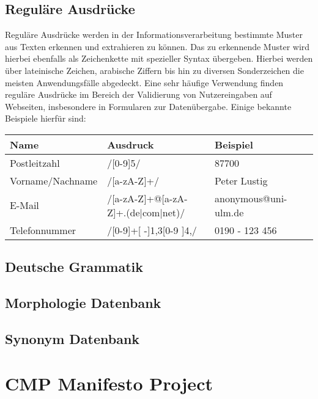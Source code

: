 \subsection{Reguläre Ausdrücke	}
Reguläre Ausdrücke werden in der Informationsverarbeitung bestimmte Muster aus Texten erkennen und extrahieren zu können. Das zu erkennende Muster wird hierbei ebenfalls als Zeichenkette mit spezieller Syntax übergeben. Hierbei werden über lateinische Zeichen, arabische Ziffern bis hin zu diversen Sonderzeichen die meisten Anwendungsfälle abgedeckt.
Eine sehr häufige Verwendung finden reguläre Ausdrücke im Bereich der Validierung von Nutzereingaben auf Webseiten, insbesondere in Formularen zur Datenübergabe. Einige bekannte Beispiele hierfür sind:
\newline
\begin{tabular}{llll}
\hline
Name & Ausdruck & Beispiel \\
\hline
Postleitzahl & /[0-9]{5}/ & 87700 \\
Vorname/Nachname & /[a-zA-Z]+/ & Peter Lustig \\
E-Mail & /[a-zA-Z]+@[a-zA-Z]+.(de|com|net)/ & anonymous@uni-ulm.de \\
Telefonnummer & /[0-9]+[ -]{1,3}[0-9 ]{4,}/ & 0190 - 123 456 \\
\hline
\end{tabular}

\subsection{Deutsche Grammatik	}
\subsection{Morphologie Datenbank	}
\subsection{Synonym Datenbank}

\section{CMP Manifesto Project}